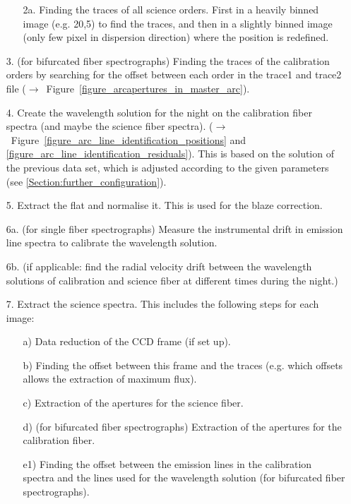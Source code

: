 \documentclass[10pt,a4paper]{article}
\begin{document}
\begin{itemize}
  \begin{itemize}
    \item[2a.] Finding the traces of all science orders. First in a heavily binned image (e.g. 20,5) to find the traces, and then in a slightly binned image (only few pixel in dispersion direction) where the position is redefined.
  \end{itemize}
  \item[3.] (for bifurcated fiber spectrographs) Finding the traces of the calibration orders by searching for the offset between each order in the trace1 and trace2 file ($\rightarrow$~Figure~\ref{figure_arcapertures_in_master_arc}). 
  \item[4.] Create the wavelength solution for the night on the calibration fiber spectra (and maybe the science fiber spectra). ($\rightarrow$~Figure~\ref{figure_arc_line_identification_positions} and \ref{figure_arc_line_identification_residuals}). This is based on the solution of the previous data set, which is adjusted according to the given parameters (see \ref{Section:further_configuration}).
  \item[5.] Extract the flat and normalise it. This is used for the blaze correction.
  \item[6a.] (for single fiber spectrographs) Measure the instrumental drift in emission line spectra to calibrate the wavelength solution.
  \item[6b.] (if applicable: find the radial velocity drift between the wavelength solutions of calibration and science fiber at different times during the night.)
  \item[7.] Extract the science spectra. This includes the following steps for each image:
  \begin{itemize}
    \item[a)] Data reduction of the CCD frame (if set up).
    \item[b)] Finding the offset between this frame and the traces (e.g. which offsets allows the extraction of maximum flux).
    \item[c)] Extraction of the apertures for the science fiber.
    \item[d)] (for bifurcated fiber spectrographs) Extraction of the apertures for the calibration fiber.
    \item[e1)] Finding the offset between the emission lines in the calibration spectra and the lines used for the wavelength solution (for bifurcated fiber spectrographs).

\end{itemize}
\end{itemize}
\end{document}
